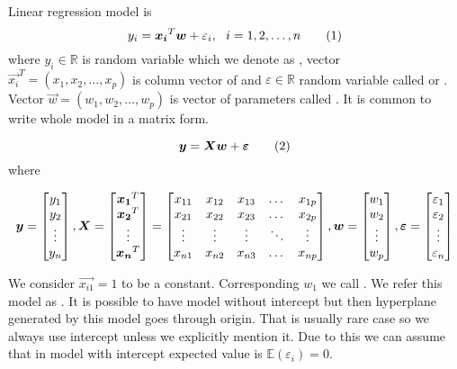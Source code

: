 \begin{definition}\label{definition:lr_model}
    Linear regression model is 
    \[ 
        y_i = \vec{x_i}^T\vec{w} + \varepsilon_i\\, \ \  i = 1,2,\ldots,n \numberthis
    \]
where $y_i \in \mathbb{R}$ is random variable which we denote as , vector $\vec{x_i}^T = (x_1, x_2, \ldots, x_p)$ is column vector of  and $\varepsilon \in \mathbb{R}$ random variable called  or . Vector $\vec{w} = (w_1, w_2, \ldots, w_p)$ is vector of parameters called  . It is common to write whole model in a matrix form. 

\begin{equation}
    \vec{y} = \vec{X}\vec{w} + \vec{\varepsilon}    \numberthis
\end{equation} where

\[ 
\vec{y} = \begin{bmatrix}
    y_{1} \\
    y_{2} \\
    \vdots \\
    y_{n}
  \end{bmatrix}\\,
 \vec{X} = \begin{bmatrix}
    \vec{x_1}^T \\
    \vec{x_2}^T \\
    \vdots \\
    \vec{x_n}^T
\end{bmatrix}
=
\begin{bmatrix}
    x_{11} & x_{12} & x_{13} & \dots  & x_{1p} \\
    x_{21} & x_{22} & x_{23} & \dots  & x_{2p} \\
    \vdots & \vdots & \vdots & \ddots & \vdots \\
    x_{n1} & x_{n2} & x_{n3} & \dots  & x_{np}
\end{bmatrix}\\,
\vec{w} = \begin{bmatrix}
    w_{1} \\
    w_{2} \\
    \vdots \\
    w_{p}
  \end{bmatrix}\\,
  \vec{\varepsilon} = \begin{bmatrix}
    \varepsilon_{1} \\
    \varepsilon_{2} \\
    \vdots \\
    \varepsilon_{n}
  \end{bmatrix}
\]

We consider $\vec{x_{i1}} = 1$ to be a constant. Corresponding $w_{1}$ we call . We refer this model as . It is possible to have model without intercept but then hyperplane generated by this model goes through origin. That is usually rare case so we always use intercept unless we explicitly mention it. Due to this we can assume that in model with intercept expected value is  $\mathbb{E}(\varepsilon_i) = 0$.
\end{definition}



